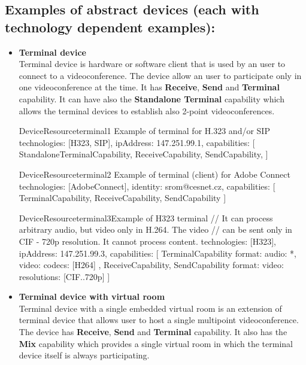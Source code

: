 \subsection*{Examples of abstract devices (each with technology dependent 
             examples):}

\begin{itemize}

\item \textbf{Terminal device} \\
  Terminal device is hardware or software client that is used by an user to 
  connect to a videoconference. The device allow an user to participate only 
  in one videoconference at the time. It has \textbf{Receive}, \textbf{Send} 
  and \textbf{Terminal} capability. It can have also the 
  \textbf{Standalone Terminal} capability which allows the terminal devices to  
  establish also 2-point videoconferences. 
  
\begin{EntityExample}{DeviceResource}{terminal1}%
      {Example of terminal for H.323 and/or SIP}
technologies: [H323, SIP],
ipAddress: 147.251.99.1,
capabilities: [
  StandaloneTerminalCapability,
  ReceiveCapability,
  SendCapability, 
]
\end{EntityExample}

\begin{EntityExample}{DeviceResource}{terminal2}%
      {Example of terminal (client) for Adobe Connect}
technologies: [AdobeConnect],
identity: srom@cesnet.cz,
capabilities: [
  TerminalCapability,
  ReceiveCapability,
  SendCapability
]
\end{EntityExample}

\begin{EntityExample}{DeviceResource}{terminal3}{Example of H323 terminal}
// It can process arbitrary audio, but video only in H.264. The video
// can be sent only in CIF - 720p resolution. It cannot process content.
technologies: [H323],
ipAddress: 147.251.99.3,
capabilities: [
  TerminalCapability {
    format: {
      audio: *,
      video: {codecs: [H264]}
    }
  },
  ReceiveCapability,
  SendCapability {
    format: {
      video: {resolutions: [CIF..720p]}
    }
  }
]
\end{EntityExample}

\item \textbf{Terminal device with virtual room} \\
  Terminal device with a single embedded virtual room is an extension of 
  terminal device that allows user to host a single multipoint 
  videoconference. The  device has \textbf{Receive}, \textbf{Send} and
  \textbf{Terminal} capability. It also has the \textbf{Mix} capability
  which provides a single virtual room in which the terminal device itself is 
  always participating.
  

\end{itemize}
